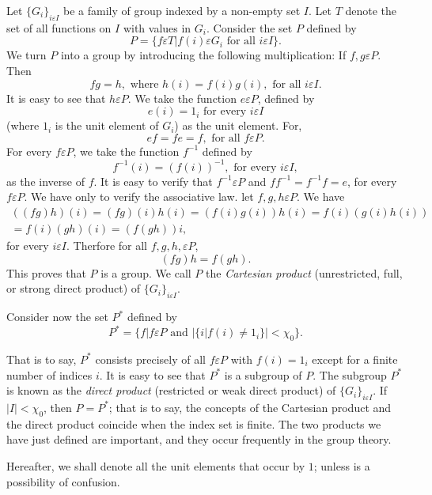 Let $\bigg \{G_i\bigg\}_{i \varepsilon I}$ be a family of group
indexed by a non-empty set $I$. Let $T$ denote the set of all
functions on $I$ with values in $G_i$. Consider the set $P$ defined by  
$$
P = \Bigg \{ f \varepsilon T \bigg | f(i) \varepsilon G_i \text{ for
  all } i \varepsilon I \Bigg \}. 
$$
We turn $P$ into a group by introducing the following multiplication:
If $f, g \varepsilon P$. Then 
$$
fg = h, \text{ where } h(i) = f(i) g(i), \text{ for all } i \varepsilon I.
$$
It is easy to see that $h \varepsilon P$. We take the function $e
\varepsilon P$, defined by  
$$
e(i) = 1_i \text{ for every } i \varepsilon I
$$
(where $1_i$ is the unit element of $G_i$) as the unit element. For, 
$$
ef = fe = f, \text{ for all } f \varepsilon P.
$$
For every $f \varepsilon P$, we take the function $f^{-1}$ defined by 
$$
f^{-1}(i) = (f(i))^{-1}, \text{ for every } i \varepsilon I,
$$
as the inverse of $f$. It is easy to verify that $f^{-1} \varepsilon
P$ and $ff^{-1} = f^{-1} f = e$, for every $f \varepsilon P$. We have
only to verify the associative law. let $f, g, h \varepsilon P$. We
have 
\begin{gather*}
  ((fg)h)(i) = (fg)(i)h(i) = (f(i)g(i))h(i) = f(i)(g(i)h(i)) \\
  = f(i)(gh)(i) = (f(gh))i,
\end{gather*}
for every $i \varepsilon I$. Therfore for all $f, g, h, \varepsilon P$,
$$
(fg)h = f(gh).
$$
This proves that $P$ is a group. We call $P$ the \textit{Cartesian
  product} (unrestricted, full, or strong direct product) of
$\bigg\{G_i\bigg \}_{i \varepsilon I}$. 

Consider now the set $P^*$ defined by
$$
P^* = \Bigg \{ f \Bigg | f \varepsilon P \text{ and }\bigg|\bigg\{ i
\bigg| f(i) \neq 1_i \bigg\} \bigg | < \chi_0\Bigg\}. 
$$

That is to say, $P^*$ consists precisely of all $f \varepsilon P$ with
$f(i)=1_i$ except for a finite number of indices $i$. It is easy to
see that $P^*$ is a subgroup of $P$. The subgroup $P^*$ is known as
the \textit{direct product} (restricted or weak direct product) of
$\bigg\{G_i\bigg\}_{i \varepsilon I}$. If $| I | < \chi_0$, then $P =
P^*$; that is to say, the concepts of the Cartesian product and the
direct product coincide when the index set is finite. The two products
we have just defined are important, and they occur frequently in the
group theory. 

Hereafter, we shall denote all the unit elements that occur by $1$;
unless is a possibility of confusion. 

